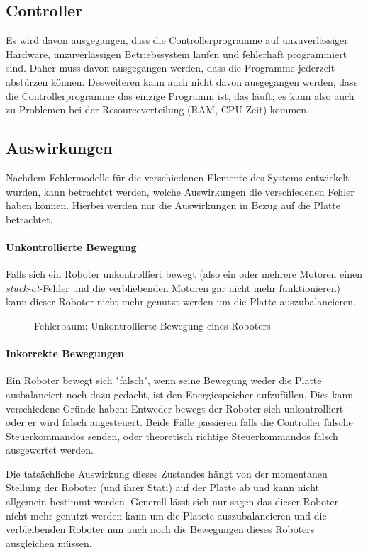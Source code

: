 \subsection{Controller}
Es wird davon ausgegangen, dass die Controllerprogramme auf unzuverl{\"{a}}ssiger Hardware, unzuverl{\"{a}}ssigen 
Betriebssystem laufen und fehlerhaft programmiert sind. Daher muss davon ausgegangen werden, dass die
Programme jederzeit abst{\"{u}}rzen k{\"{o}}nnen. Desweiteren kann auch nicht davon ausgegangen werden,
dass die Controllerprogramme das einzige Programm ist, das l{\"{a}}uft; es kann also auch zu Problemen bei
der Resourceverteilung (RAM, CPU Zeit) kommen.

\subsection{Auswirkungen}
Nachdem Fehlermodelle f{\"{u}}r die verschiedenen Elemente des Systems entwickelt wurden, kann
betrachtet werden, welche Auswirkungen die verschiedenen Fehler haben k{\"{o}}nnen. Hierbei werden nur
die Auswirkungen in Bezug auf die Platte betrachtet.

\paragraph{Unkontrollierte Bewegung} Falls sich ein Roboter unkontrolliert bewegt (also ein oder
mehrere Motoren einen \textit{stuck-at}-Fehler und die verbliebenden Motoren gar nicht mehr funktionieren)
kann dieser Roboter nicht mehr genutzt werden um die Platte auszubalancieren.
\begin{figure}
	\centering
	\caption{Fehlerbaum: Unkontrollierte Bewegung eines Roboters}
	\label{fig:fault-tree-robot}
\end{figure}
\clearpage

\paragraph{Inkorrekte Bewegungen} Ein Roboter bewegt sich "falsch", wenn seine Bewegung weder die Platte 
ausbalanciert noch dazu gedacht, ist den Energiespeicher aufzuf{\"{u}}llen. Dies kann verschiedene Gr{\"{u}}nde 
haben: Entweder bewegt der Roboter sich unkontrolliert oder er wird falsch angesteuert. Beide F{\"{a}}lle
passieren falls die Controller falsche Steuerkommandos senden, oder theoretisch richtige Steuerkommandos
falsch ausgewertet werden.

Die tats{\"{a}}chliche Auswirkung dieses Zustandes h{\"{a}}ngt von der momentanen Stellung der Roboter (und ihrer
Stati) auf der Platte ab und kann nicht allgemein bestimmt werden. Generell l{\"{a}}sst sich nur sagen das dieser
Roboter nicht mehr genutzt werden kann um die Platete auszubalancieren und die verbleibenden Roboter nun auch noch
die Bewegungen dieses Roboters ausgleichen m{\"{u}}ssen.

